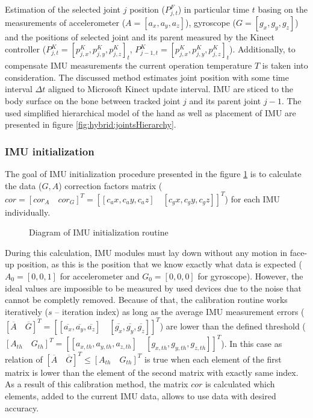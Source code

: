 \documentclass[sensors,article,submit,moreauthors,pdftex,10pt,a4paper]{mdpi}
\begin{document}
Estimation of the selected joint $j$ position ($P^F_{j,t}$) in particular time $t$ basing on the measurements of accelerometer ($A=[a_x,a_y,a_z]$), gyroscope ($G=[g_x,g_y,g_z]$) and the positions of selected joint and its parent measured by the Kinect controller ($P^K_{j,t} = [p^K_{j,x}, p^K_{j,y}, p^K_{j,z}]_t$, $P^K_{j-1,t} = [p^K_{j,x}, p^K_{j,y}, p^K_{j,z}]_t$). Additionally, to compensate IMU measurements the current operation temperature $T$ is taken into consideration. The discussed method estimates joint position with some time interval $\Delta t$ aligned to Microsoft Kinect update interval. IMU are sticed to the body surface on the bone between tracked joint $j$ and its parent joint $j-1$. The used simplified hierarchical model of the hand as well as placement of IMU are presented in figure \ref{fig:hybrid:jointsHierarchy}.	
	
	\subsubsection{IMU initialization}
	The goal of IMU initialization procedure presented in the figure \ref{fig:hybrid:IMUCalibration} is to calculate the data ($G, A$) correction factors matrix ($cor = [cor_A \quad cor_G]^T = [[c_ax,c_ay,c_az ]\quad[c_gx,c_gy,c_gz ]]^T $) for each IMU individually. 

		\begin{figure}[!htb]
	\scalebox{0.55}{		
		
	}
	\caption{Diagram of IMU initialization routine}
	\label{fig:hybrid:IMUCalibration}
\end{figure}

	During this calculation, IMU modules must lay down without any motion in face-up position, as this is the position that we know exactly what data is expected ($A_0=[0,0,1]$ for accelerometer and $G_0=[0,0,0]$ for gyroscope). However, the ideal values are impossible to be measured by used devices due to the noise that cannot be completly removed. Because of that, the calibration routine works iteratively ($s$ -- iteration index) as long as the average IMU measurement errors ($[\overline{A}\quad \overline{G}]^T = [[\overline{a_x},\overline{a_y},\overline{a_z}]\quad[\overline{g_x},\overline{g_y},\overline{g_z}]]^T$) are lower than the defined threshold ($[A_{th}\quad G_{th}]^T = [[a_{x,th},a_{y,th},a_{z,th}]\quad[g_{x,th},g_{y,th},g_{z,th}]]^T$). In this case as relation of $[\overline{A}\quad \overline{G}]^T \leq [A_{th}\quad G_{th}]^T$ is true when each element of the first matrix is lower than the element of the second matrix with exactly same index. As a result of this calibration method, the matrix $cor$ is calculated which elements, added to the current IMU data, allows to use data with desired accuracy. 
	
\end{document}
